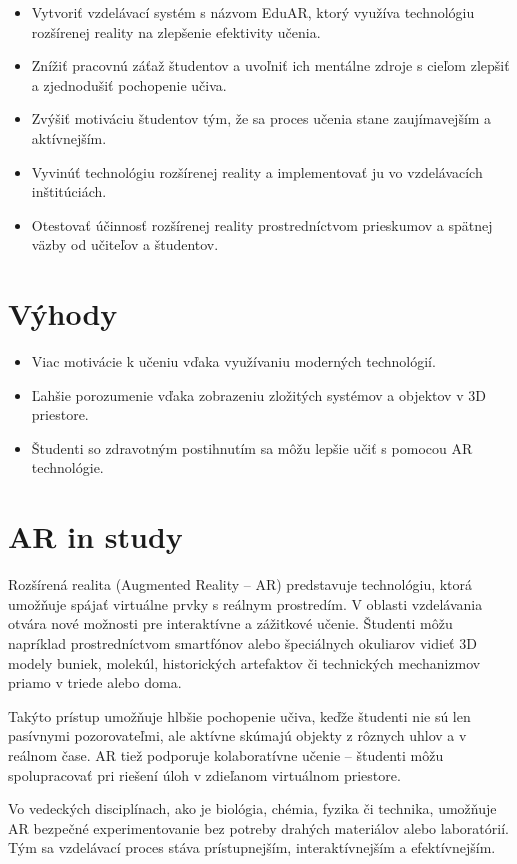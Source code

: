 \documentclass[a4paper,12pt]{article}
\begin{document}
\begin{itemize}
    \item Vytvoriť vzdelávací systém s názvom EduAR, ktorý využíva technológiu rozšírenej reality na zlepšenie efektivity učenia.
    \item Znížiť pracovnú záťaž študentov a uvoľniť ich mentálne zdroje s cieľom zlepšiť a zjednodušiť pochopenie učiva.
    \item Zvýšiť motiváciu študentov tým, že sa proces učenia stane zaujímavejším a aktívnejším.
    \item Vyvinúť technológiu rozšírenej reality a implementovať ju vo vzdelávacích inštitúciách.
    \item Otestovať účinnosť rozšírenej reality prostredníctvom prieskumov a spätnej väzby od učiteľov a študentov.
\end{itemize}

\vspace{1em}
\section{Výhody}
\begin{itemize}
    \item Viac motivácie k učeniu vďaka využívaniu moderných technológií.
    \item Ľahšie porozumenie vďaka zobrazeniu zložitých systémov a objektov v 3D priestore.
    \item Študenti so zdravotným postihnutím sa môžu lepšie učiť s pomocou AR technológie.
\end{itemize}

\section{AR in study}

Rozšírená realita (Augmented Reality – AR) predstavuje technológiu, ktorá umožňuje spájať virtuálne prvky s reálnym prostredím. V oblasti vzdelávania otvára nové možnosti pre interaktívne a zážitkové učenie. Študenti môžu napríklad prostredníctvom smartfónov alebo špeciálnych okuliarov vidieť 3D modely buniek, molekúl, historických artefaktov či technických mechanizmov priamo v triede alebo doma.

Takýto prístup umožňuje hlbšie pochopenie učiva, keďže študenti nie sú len pasívnymi pozorovateľmi, ale aktívne skúmajú objekty z rôznych uhlov a v reálnom čase. AR tiež podporuje kolaboratívne učenie – študenti môžu spolupracovať pri riešení úloh v zdieľanom virtuálnom priestore.

Vo vedeckých disciplínach, ako je biológia, chémia, fyzika či technika, umožňuje AR bezpečné experimentovanie bez potreby drahých materiálov alebo laboratórií. Tým sa vzdelávací proces stáva prístupnejším, interaktívnejším a efektívnejším.
\end{document}
